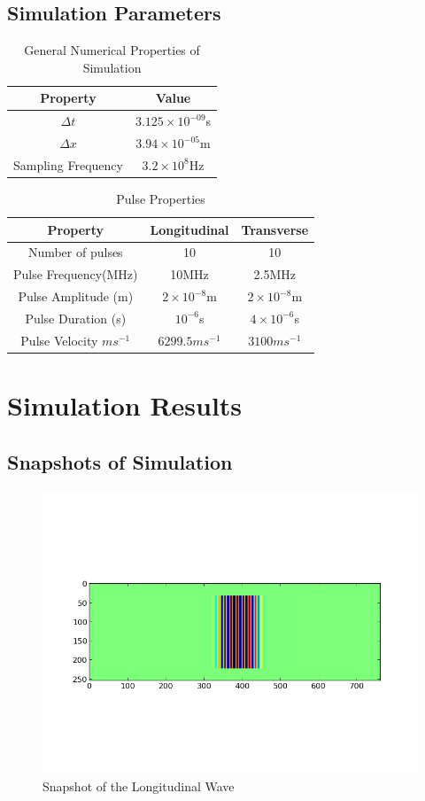 \subsection{Simulation Parameters}
\begin{table}[ht]
\caption{General Numerical Properties of Simulation}
\begin{tabular}{|c|c|}
\hline
\textbf{Property} & \textbf{Value} \\ \hline
$\Delta t$ & $3.125 \times 10^{-09}$s \\ \hline
$\Delta x$ & $3.94 \times 10^{-05}$m \\ \hline
Sampling Frequency & $3.2 \times 10^{8}$Hz \\ \hline
\end{tabular}
\end{table}
\begin{table}[ht]
\caption{Pulse Properties}
\begin{tabular}{|c|c|c|}
\hline
\textbf{Property} & \textbf{Longitudinal} & \textbf{Transverse} \\ \hline
Number of pulses & 10 & 10 \\ \hline
Pulse Frequency(MHz) & 10MHz & 2.5MHz \\ \hline
Pulse Amplitude (m) & $2 \times 10^{-8}$m & $2 \times 10^{-8}$m \\ \hline
Pulse Duration (s) & $10^{-6}$s & $4 \times 10^{-6}$s \\ \hline
Pulse Velocity $ms^{-1}$ & $6299.5ms^{-1}$ & $3100ms^{-1}$\\ \hline 
\end{tabular}
\end{table}
\section{Simulation Results}
\subsection{Snapshots of Simulation}
\begin{figure}[ht]
\centering
\includegraphics[scale=0.5]{images/chapter_3/simulation_picture_long.png}
\caption{Snapshot of the Longitudinal Wave}
\end{figure}

